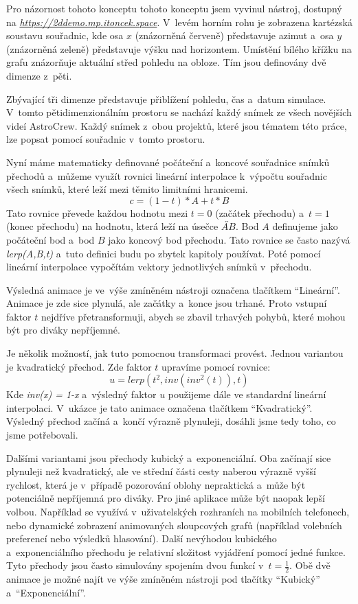 \documentclass[12pt,a4paper,titlepage]{article}
\newcommand{\link}[2]{\href{#1}{\textit{#2}}}%
\begin{document}
Pro názornost tohoto konceptu tohoto konceptu jsem vyvinul nástroj, dostupný na \link{https://2ddemo.mp.itoncek.space}{https://2ddemo.mp.itoncek.space}. V~levém horním rohu je zobrazena kartézská soustavu souřadnic, kde osa $x$ (znázorněná červeně) představuje azimut a~osa $y$ (znázorněná zeleně) představuje výšku nad horizontem. Umístění bílého křížku na grafu znázorňuje aktuální střed pohledu na obloze. Tím jsou definovány dvě dimenze z~pěti.

Zbývající tři dimenze představuje přiblížení pohledu, čas a~datum simulace. V~tomto pětidimenzionálním prostoru se nachází každý snímek ze všech novějších videí AstroCrew. Každý snímek z~obou projektů, které jsou tématem této práce, lze popsat pomocí souřadnic v~tomto prostoru.

Nyní máme matematicky definované počáteční a~koncové souřadnice snímků přechodů a~můžeme využít rovnici lineární interpolace k~výpočtu souřadnic všech snímků, které leží mezi těmito limitními hranicemi.
\[c = (1-t)*A + t * B\] 
Tato rovnice převede každou hodnotu mezi $t=0$ (začátek přechodu) a~$t=1$ (konec přechodu) na hodnotu, která leží na úsečce $\overleftrightarrow{AB}$. Bod $A$ definujeme jako počáteční bod a~bod $B$ jako koncový bod přechodu. Tato rovnice se často nazývá \textit{lerp(A,B,t)} a~tuto definici budu po zbytek kapitoly používat. Poté pomocí lineární interpolace vypočítám vektory jednotlivých snímků v~přechodu.%

Výsledná animace je ve~výše zmíněném nástroji označena tlačítkem \enquote{Lineární}. Animace je zde sice plynulá, ale začátky a~konce jsou trhané. Proto vstupní faktor $t$ nejdříve přetransformuji, abych se zbavil trhavých pohybů, které mohou být pro diváky nepříjemné. 

Je několik možností, jak tuto pomocnou transformaci provést. Jednou variantou je kvadratický přechod. Zde faktor $t$ upravíme pomocí rovnice:
\[u = lerp({t}^{2}, inv({inv}^{2}(t)), t)\]
Kde \textit{inv(x) = 1-x} a~výsledný faktor $u$ použijeme dále ve standardní lineární interpolaci.  V~ukázce je tato animace označena tlačítkem \enquote{Kvadratický}. Výsledný přechod začíná a~končí výrazně plynuleji, dosáhli jsme tedy toho, co jsme potřebovali. %

Dalšími variantami jsou přechody kubický a~exponenciální. Oba začínají sice plynuleji než kvadratický, ale ve střední části cesty naberou výrazně vyšší rychlost, která je v~případě pozorování oblohy nepraktická a~může být potenciálně nepříjemná pro diváky. Pro jiné aplikace může být naopak lepší volbou. Například se využívá v~uživatelských rozhraních na mobilních telefonech, nebo dynamické zobrazení animovaných sloupcových grafů (například volebních preferencí nebo výsledků hlasování). Další nevýhodou kubického a~exponenciálního přechodu je relativní složitost vyjádření pomocí jedné funkce. Tyto přechody jsou často simulovány spojením dvou funkcí v~$t=\frac{1}{2}$. Obě dvě animace je možné najít ve výše zmíněném nástroji pod tlačítky \enquote{Kubický} a~\enquote{Exponenciální}.
\end{document}
